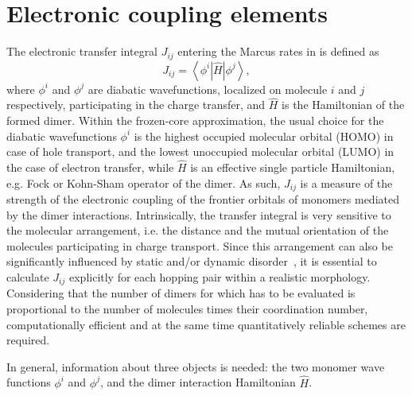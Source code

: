 \section{Electronic coupling elements}
\label{sec:transfer_integrals}

The electronic transfer integral $J_{ij}$ entering the Marcus rates in  is defined as
\begin{equation}
   J_{ij} = \left\langle \phi^i \left\vert \hat{H} \right\vert \phi^j \right\rangle ,
\label{equ:TI}
\end{equation}
where $\phi^i$ and $\phi^j$ are diabatic wavefunctions, localized on molecule $i$ and $j$ respectively, participating in the charge transfer, and $\hat{H}$ is the Hamiltonian of the formed dimer. Within the frozen-core approximation, the usual choice for the diabatic wavefunctions $\phi^i$  is the highest occupied molecular orbital (HOMO) in case of hole transport, and the lowest unoccupied molecular orbital (LUMO) in the case of electron transfer, while $\hat{H}$ is an effective single particle Hamiltonian, e.g. Fock or Kohn-Sham operator of the dimer. As such, $J_{ij}$ is a measure of the strength of the electronic coupling of the frontier orbitals of monomers mediated by the dimer interactions. Intrinsically, the transfer integral is very sensitive to the molecular arrangement, i.e. the distance and the mutual orientation of the molecules participating in charge transport. Since this arrangement can also be significantly influenced by
static and/or dynamic disorder~\cite{hutchison_hopping_2005,kirkpatrick_columnar_2008,troisi_charge_2009,vehoff_charge_2010-1,vehoff_charge_2010-2},
it is essential to calculate $J_{ij}$ explicitly for each hopping pair within a realistic morphology. Considering that the number of dimers for which  has to be evaluated is proportional to the number of molecules times their coordination number, computationally efficient and at the same time quantitatively reliable schemes are required.

In general, information about three objects is needed: the two monomer wave functions $\phi^i$ and $\phi^j$, and the dimer interaction Hamiltonian $\hat{H}$.  



